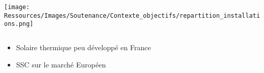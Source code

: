 \documentclass[xcolor=x11names, compress, 11pt]{beamer}
\begin{document}
\begin{frame}[c]
    \vfill
    \centering
    \small
    \texttt{[image: Ressources/Images/Soutenance/Contexte\_objectifs/repartition\_installations.png]}
    \begin{columns}
        \begin{column}{0.45\textwidth}
            \begin{center}
                \begin{itemize}
                    \item Solaire thermique peu développé en France
                    \item SSC sur le marché Européen
                \end{itemize}
            \end{center}
        \end{column}%
        \begin{column}{0.45\textwidth}
            \begin{center}
            \end{center}
        \end{column}%
    \end{columns}%
    \vfill
\end{frame}



\end{document}
